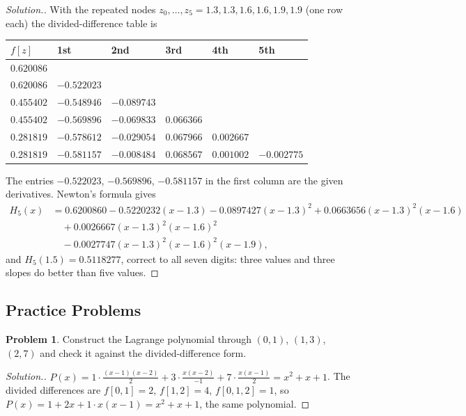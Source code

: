 \documentclass[11pt,a4paper]{article}
\numberwithin{equation}{section}
\theoremstyle{definition}
\newtheorem{problemx}{Problem}[subsection]
\newenvironment{problem}{\begin{problemx}}{\end{problemx}}
\newenvironment{solution}
  {\renewcommand{\qedsymbol}{}\begin{proof}[\textit{Solution}.]}
  {\end{proof}}
\begin{document}
\begin{solution}
With the repeated nodes $z_0,\dots,z_5 = 1.3, 1.3, 1.6, 1.6, 1.9, 1.9$ (one row each) the divided-difference table is
\begin{center}
\begin{tabular}{llllll}
\hline
$f[z]$ & 1st & 2nd & 3rd & 4th & 5th\\
\hline
$0.620086$ & & & & & \\
$0.620086$ & $-0.522023$ & & & & \\
$0.455402$ & $-0.548946$ & $-0.089743$ & & & \\
$0.455402$ & $-0.569896$ & $-0.069833$ & $0.066366$ & & \\
$0.281819$ & $-0.578612$ & $-0.029054$ & $0.067966$ & $0.002667$ & \\
$0.281819$ & $-0.581157$ & $-0.008484$ & $0.068567$ & $0.001002$ & $-0.002775$\\
\hline
\end{tabular}
\end{center}
The entries $-0.522023$, $-0.569896$, $-0.581157$ in the first column are the given derivatives. Newton's formula gives
\begin{align*}
H_5(x) &= 0.6200860-0.5220232(x-1.3)-0.0897427(x-1.3)^2+0.0663656(x-1.3)^2(x-1.6)\\
&\quad+0.0026667(x-1.3)^2(x-1.6)^2\\
&\quad-0.0027747(x-1.3)^2(x-1.6)^2(x-1.9),
\end{align*}
and $H_5(1.5) = 0.5118277$, correct to all seven digits: three values and three slopes do better than five values.
\end{solution}


\subsection{Practice Problems}

\begin{problem}
Construct the Lagrange polynomial through $(0,1)$, $(1,3)$, $(2,7)$ and check it against the divided-difference form.
\end{problem}
\begin{solution}
$P(x) = 1\cdot\frac{(x-1)(x-2)}{2}+3\cdot\frac{x(x-2)}{-1}+7\cdot\frac{x(x-1)}{2} = x^2+x+1$. The divided differences are $f[0,1] = 2$, $f[1,2] = 4$,
$f[0,1,2] = 1$, so $P(x) = 1+2x+1\cdot x(x-1) = x^2+x+1$, the same polynomial.
\end{solution}
\end{document}
